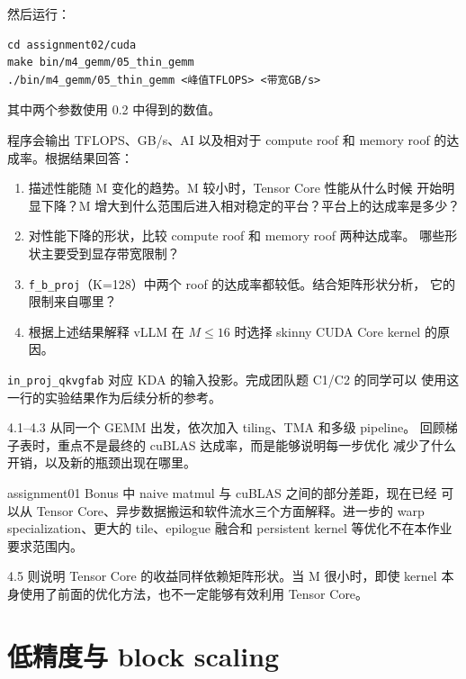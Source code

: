 \documentclass[11pt,a4paper,fontset=fandol]{ctexart}
\begin{document}
然后运行：

\begin{verbatim}
cd assignment02/cuda
make bin/m4_gemm/05_thin_gemm
./bin/m4_gemm/05_thin_gemm <峰值TFLOPS> <带宽GB/s>
\end{verbatim}

其中两个参数使用 0.2 中得到的数值。

程序会输出 TFLOPS、GB/s、AI 以及相对于 compute roof 和 memory roof
的达成率。根据结果回答：

\begin{enumerate}
\def\labelenumi{(\alph{enumi})}
\item
  描述性能随 M 变化的趋势。M 较小时，Tensor Core 性能从什么时候
  开始明显下降？M
  增大到什么范围后进入相对稳定的平台？平台上的达成率是多少？
\item
  对性能下降的形状，比较 compute roof 和 memory roof 两种达成率。
  哪些形状主要受到显存带宽限制？
\item
  \texttt{f\_b\_proj}（K=128）中两个 roof
  的达成率都较低。结合矩阵形状分析， 它的限制来自哪里？
\item
  根据上述结果解释 vLLM 在 \(M \le 16\) 时选择 skinny CUDA Core kernel
  的原因。
\end{enumerate}

\texttt{in\_proj\_qkvgfab} 对应 KDA 的输入投影。完成团队题 C1/C2
的同学可以 使用这一行的实验结果作为后续分析的参考。

\begin{lookback}

4.1--4.3 从同一个 GEMM 出发，依次加入 tiling、TMA 和多级 pipeline。
回顾梯子表时，重点不是最终的 cuBLAS 达成率，而是能够说明每一步优化
减少了什么开销，以及新的瓶颈出现在哪里。

assignment01 Bonus 中 naive matmul 与 cuBLAS 之间的部分差距，现在已经
可以从 Tensor Core、异步数据搬运和软件流水三个方面解释。进一步的 warp
specialization、更大的 tile、epilogue 融合和 persistent kernel
等优化不在本作业要求范围内。

4.5 则说明 Tensor Core 的收益同样依赖矩阵形状。当 M 很小时，即使 kernel
本身使用了前面的优化方法，也不一定能够有效利用 Tensor Core。

\end{lookback}

\section{低精度与 block
scaling}\label{ux4f4eux7cbeux5ea6ux4e0e-block-scaling}
\end{document}
